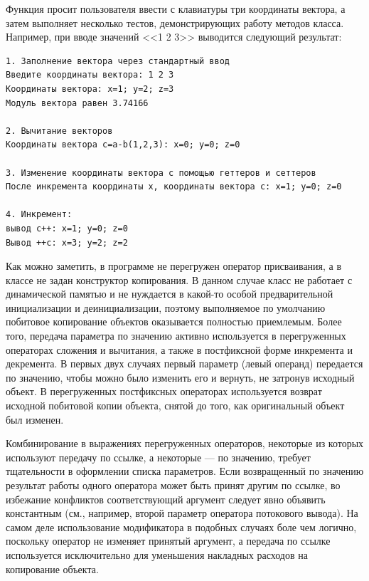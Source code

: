 Функция  просит пользователя ввести с клавиатуры три
координаты вектора, а затем выполняет несколько тестов, демонстрирующих работу методов класса. Например, при вводе
значений <<1 2 3>> выводится следующий результат:
\begin{verbatim}
1. Заполнение вектора через стандартный ввод 
Введите координаты вектора: 1 2 3 
Координаты вектора: x=1; y=2; z=3 
Модуль вектора равен 3.74166 

2. Вычитание векторов 
Координаты вектора с=a-b(1,2,3): x=0; y=0; z=0 

3. Изменение координаты вектора с помощью геттеров и сеттеров 
После инкремента координаты x, координаты вектора c: x=1; y=0; z=0 

4. Инкремент: 
вывод с++: x=1; y=0; z=0 
Вывод ++с: x=3; y=2; z=2
\end{verbatim}


Как можно заметить, в программе не перегружен оператор присваивания, а в классе
 не задан конструктор копирования. В данном случае класс не
работает с динамической памятью и не нуждается в какой-то особой предварительной инициализации и деинициализации,
поэтому выполняемое по умолчанию побитовое копирование объектов оказывается полностью приемлемым. Более того, передача
параметра по значению активно используется в перегруженных операторах сложения и вычитания, а также в постфиксной форме
инкремента и декремента. В первых двух случаях первый параметр (левый операнд) передается по значению, чтобы можно было
изменить его и вернуть, не затронув исходный объект. В перегруженных постфиксных операторах используется возврат
исходной побитовой копии объекта, снятой до того, как оригинальный объект был изменен.

Комбинирование в выражениях перегруженных операторов, некоторые из которых используют передачу по
ссылке, а некоторые --- по значению, требует тщательности в оформлении списка параметров. Если возвращенный по значению
результат работы одного оператора может быть принят другим по ссылке, во избежание конфликтов соответствующий аргумент
следует явно объявить константным (см., например, второй параметр оператора потокового вывода). На самом деле
использование модификатора  в подобных случаях боле чем логично,
поскольку оператор не изменяет принятый аргумент, а передача по ссылке используется исключительно для уменьшения
накладных расходов на копирование объекта.

